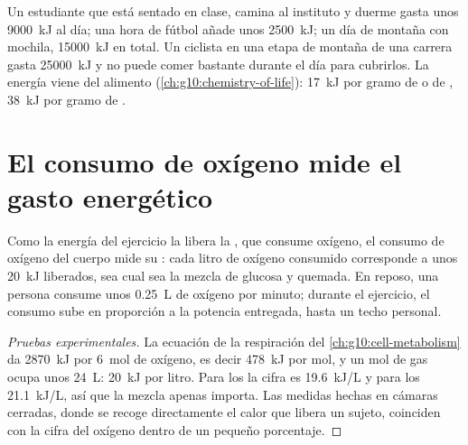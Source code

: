 \begin{example}\label{ex:g10:exercise-and-energy:budgets}
Un estudiante que está sentado en clase, camina al instituto y duerme
gasta unos \qty{9000}{kJ} al día; una hora de fútbol añade unos
\qty{2500}{kJ}; un día de montaña con mochila, \qty{15000}{kJ} en
total. Un ciclista en una etapa de montaña de una carrera gasta
\qty{25000}{kJ} y no puede comer bastante durante el día para
cubrirlos. La energía viene del alimento
(\cref{ch:g10:chemistry-of-life}): \qty{17}{kJ} por gramo de  o
de , \qty{38}{kJ} por gramo de .
\end{example}

\section{El consumo de oxígeno mide el gasto energético}

\begin{proposition}\label{prop:g10:exercise-and-energy:oxygen}
Como la energía del ejercicio la libera la , que
consume oxígeno, el consumo de oxígeno del cuerpo mide su : cada litro de oxígeno consumido corresponde a unos
\qty{20}{kJ} liberados, sea cual sea la mezcla de glucosa y 
quemada. En reposo, una persona consume unos \qty{0.25}{L} de oxígeno
por minuto; durante el ejercicio, el consumo sube en proporción a la
potencia entregada, hasta un techo personal.
\end{proposition}
\begin{proof}[Pruebas experimentales]
La ecuación de la respiración del \cref{ch:g10:cell-metabolism} da
\qty{2870}{kJ} por \qty{6}{mol} de oxígeno, es decir \qty{478}{kJ} por
mol, y un mol de gas ocupa unos \qty{24}{L}: \qty{20}{kJ} por litro.
Para los  la cifra es \qty{19.6}{kJ/L} y para los 
\qty{21.1}{kJ/L}, así que la mezcla apenas importa. Las medidas hechas
en cámaras cerradas, donde se recoge directamente el calor que libera
un sujeto, coinciden con la cifra del oxígeno dentro de un pequeño
porcentaje.
\end{proof}

